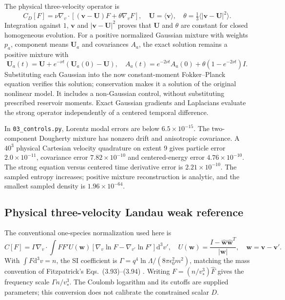 \documentclass[11pt,letterpaper]{article}
\newcommand{\dd}{\mathrm d}
\begin{document}
The physical three-velocity operator is
\begin{equation}
 C_D[F]=\nu\nabla_v\cdot[(\bm v-\bm U)F+\theta\nabla_vF],\quad
 \bm U=\langle\bm v\rangle,\quad
 \theta=\tfrac13\langle|\bm v-\bm U|^2\rangle.
\end{equation}
Integration against $1$, $\bm v$ and $|\bm v-\bm U|^2$ proves that $\bm U$ and
$\theta$ are constant for closed homogeneous evolution. For a positive
normalized Gaussian mixture with weights $p_a$, component means $\bm U_a$ and
covariances $A_a$, the exact solution remains a positive mixture with
\begin{equation}
 \bm U_a(t)=\bm U+e^{-\nu t}(\bm U_a(0)-\bm U),\quad
 A_a(t)=e^{-2\nu t}A_a(0)+\theta(1-e^{-2\nu t})I.
\end{equation}
Substituting each Gaussian into the now constant-moment Fokker--Planck equation
verifies this solution; conservation makes it a solution of the original
nonlinear model. It includes a non-Gaussian control, without substituting
prescribed reservoir moments. Exact Gaussian gradients and Laplacians evaluate
the strong operator independently of a centered temporal difference.

In \texttt{03\_controls.py}, Lorentz modal errors are below $6.5\times10^{-15}$.
The two-component Dougherty mixture has nonzero drift and anisotropic
covariance. A $40^3$ physical Cartesian velocity quadrature on extent 9 gives
particle error $2.0\times10^{-11}$, covariance error $7.82\times10^{-10}$ and
centered-energy error $4.76\times10^{-10}$. The strong equation versus centered
time derivative error is $2.21\times10^{-10}$. The sampled entropy increases;
positive mixture reconstruction is analytic, and the smallest sampled density
is $1.96\times10^{-64}$.

\subsection*{Physical three-velocity Landau weak reference}

The conventional one-species normalization used here is
\begin{equation}
 C[F]=\Gamma\nabla_v\cdot\int FF' U(\bm w)
       [\nabla_v\ln F-\nabla_{v'}\ln F']\dd^3v',\quad
 U(\bm w)=\frac{I-\hat{\bm w}\hat{\bm w}^{T}}{|\bm w|},\quad
 \bm w=\bm v-\bm v'.
 \label{eq:landaucontrol}
\end{equation}
With $\int F\dd^3v=n$, the SI coefficient is
$\Gamma=q^4\ln\Lambda/(8\pi\epsilon_0^2m^2)$, matching the mass convention of
Fitzpatrick's Eqs.~(3.93)--(3.94) \cite{FitzpatrickLandau}.
Writing $F=(n/v_*^3)\widehat F$ gives the frequency scale
$\Gamma n/v_*^3$. The Coulomb logarithm and its cutoffs are supplied parameters;
this conversion does not calibrate the constrained scalar $D$.
\end{document}
